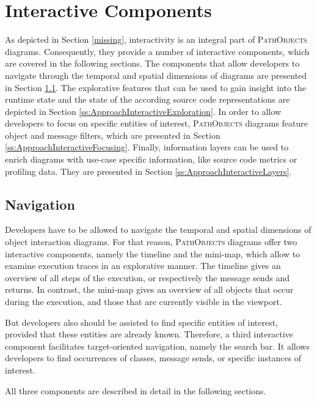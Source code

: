 \section{Interactive Components}
\label{s:ApproachInteractivity}
As depicted in Section \ref{missing}, interactivity is an integral part of \textsc{PathObjects} diagrams.
Consequently, they provide a number of interactive components, which are covered in the following sections.
The components that allow developers to navigate through the temporal and spatial dimensions of diagrams are presented in Section \ref{ss:ApproachInteractiveNavigation}.
The explorative features that can be used to gain insight into the runtime state and the state of the according source code representations are depicted in Section \ref{ss:ApproachInteractiveExploration}.
In order to allow developers to focus on specific entities of interest, \textsc{PathObjects} diagrams feature object and message filters, which are presented in Section \ref{ss:ApproachInteractiveFocusing}.
Finally, information layers can be used to enrich diagrams with use-case specific information, like source code metrics or profiling data.
They are presented in Section \ref{ss:ApproachInteractiveLayers}.

\subsection{Navigation}
\label{ss:ApproachInteractiveNavigation}
Developers have to be allowed to navigate the temporal and spatial dimensions of object interaction diagrams.
For that reason, \textsc{PathObjects} diagrams offer two interactive components, namely the timeline and the mini-map, which allow to examine execution traces in an explorative manner.
The timeline gives an overview of all steps of the execution, or respectively the message sends and returns.
In contrast, the mini-map gives an overview of all objects that occur during the execution, and those that are currently visible in the viewport.

But developers also should be assisted to find specific entities of interest, provided that these entities are already known.
Therefore, a third interactive component facilitates target-oriented navigation, namely the search bar.
It allows developers to find occurrences of classes, message sends, or specific instances of interest.

All three components are described in detail in the following sections.

